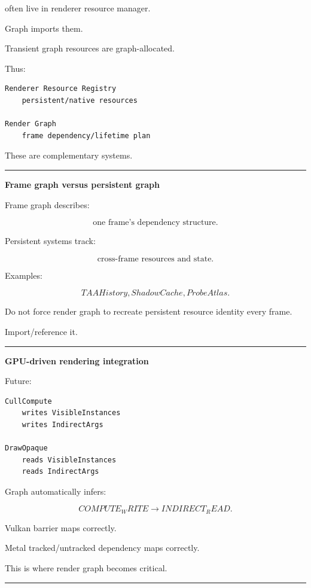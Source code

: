 often live in renderer resource manager.

Graph imports them.

Transient graph resources are graph-allocated.

Thus:

\begin{verbatim}
Renderer Resource Registry
    persistent/native resources

Render Graph
    frame dependency/lifetime plan
\end{verbatim}

These are complementary systems.

\begin{center}\rule{0.5\linewidth}{0.5pt}\end{center}

\textbf{Frame graph versus persistent graph}

Frame graph describes:

\[
\text{one frame's dependency structure}.
\]

Persistent systems track:

\[
\text{cross-frame resources and state}.
\]

Examples:

\[
TAAHistory,
ShadowCache,
ProbeAtlas.
\]

Do not force render graph to recreate persistent resource identity every frame.

Import/reference it.

\begin{center}\rule{0.5\linewidth}{0.5pt}\end{center}

\textbf{GPU-driven rendering integration}

Future:

\begin{verbatim}
CullCompute
    writes VisibleInstances
    writes IndirectArgs

DrawOpaque
    reads VisibleInstances
    reads IndirectArgs
\end{verbatim}

Graph automatically infers:

\[
COMPUTE_WRITE
\rightarrow
INDIRECT_READ.
\]

Vulkan barrier maps correctly.

Metal tracked/untracked dependency maps correctly.

This is where render graph becomes critical.

\begin{center}\rule{0.5\linewidth}{0.5pt}\end{center}

